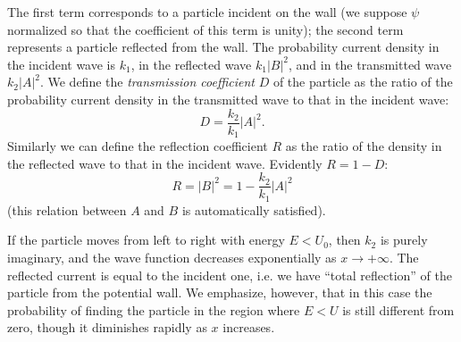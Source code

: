 The first term corresponds to a particle incident on the wall (we suppose $\psi$ normalized so that the coefficient of this term is unity); the second term represents a particle reflected from the wall. The probability current density in the incident wave is $ k_1 $, in the reflected wave $ k_1|B|^2 $, and in the transmitted wave $ k_2|A|^2 $. We define the \textit{transmission coefficient} $ D $ of the particle as the ratio of the probability current density in the transmitted wave to that in the incident wave:
\begin{equation}\label{25.3}
D=\frac{k_2}{k_1}|A|^2.
\end{equation}
Similarly we can define the reflection coefficient $ R $ as the ratio of the density in the reflected wave to that in the incident wave. Evidently $ R = 1 − D $:
\begin{equation}\label{25.4}
R=|B|^2=1-\frac{k_2}{k_1}|A|^2
\end{equation}
(this relation between $ A $ and $ B $ is automatically satisfied).

If the particle moves from left to right with energy $ E < U_0 $, then $ k_2 $ is purely imaginary, and the wave function decreases exponentially as $ x \to+\infty $. The reflected current is equal to the incident one, i.e. we have “total reflection” of the particle from the potential wall. We emphasize, however, that in this case the probability of finding the particle in the region where $ E < U $ is still different from zero, though it diminishes rapidly as $ x $ increases.

